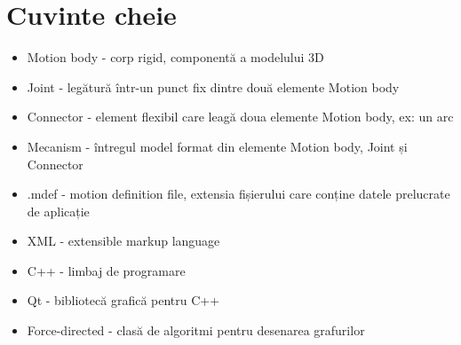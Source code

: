 \newpage
\section{Cuvinte cheie}
\begin{itemize}
    \item Motion body - corp rigid, componentă a modelului 3D
    \item Joint - legătură într-un punct fix dintre două elemente Motion body
    \item Connector - element flexibil care leagă doua elemente Motion body, ex: un arc
    \item Mecanism - întregul model format din elemente Motion body, Joint și Connector
    \item .mdef - motion definition file, extensia fișierului care conține datele prelucrate de aplicație
    \item XML - extensible markup language
    \item C++ - limbaj de programare
    \item Qt - bibliotecă grafică pentru C++
    \item Force-directed - clasă de algoritmi pentru desenarea grafurilor
\end{itemize}

